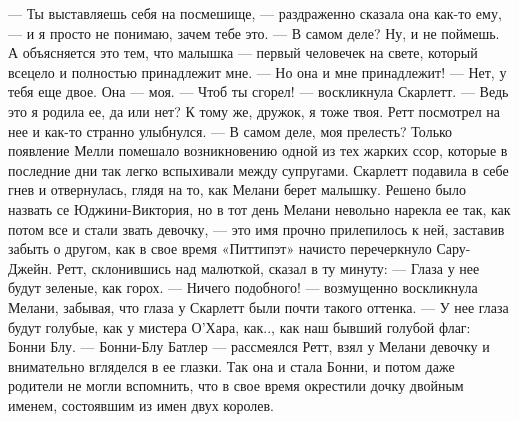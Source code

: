 — Ты выставляешь себя на посмешище, — раздраженно сказала она как-то ему, — и я просто не понимаю, зачем тебе это.
— В самом деле? Ну, и не поймешь. А объясняется это тем, что малышка — первый человечек на свете, который всецело и полностью принадлежит мне.
— Но она и мне принадлежит!
— Нет, у тебя еще двое. Она — моя.
— Чтоб ты сгорел! — воскликнула Скарлетт. — Ведь это я родила ее, да или нет? К тому же, дружок, я тоже твоя. Ретт посмотрел на нее и как-то странно улыбнулся.
— В самом деле, моя прелесть?
Только появление Мелли помешало возникновению одной из тех жарких ссор, которые в последние дни так легко вспыхивали между супругами. Скарлетт подавила в себе гнев и отвернулась, глядя на то, как Мелани берет малышку. Решено было назвать се Юджини-Виктория, но в тот день Мелани невольно нарекла ее так, как потом все и стали звать девочку, — это имя прочно прилепилось к ней, заставив забыть о другом, как в свое время «Питтипэт» начисто перечеркнуло Сару-Джейн.
Ретт, склонившись над малюткой, сказал в ту минуту:
— Глаза у нее будут зеленые, как горох.
— Ничего подобного! — возмущенно воскликнула Мелани, забывая, что глаза у Скарлетт были почти такого оттенка. — У нее глаза будут голубые, как у мистера О’Хара, как.., как наш бывший голубой флаг: Бонни Блу.
— Бонни-Блу Батлер — рассмеялся Ретт, взял у Мелани девочку и внимательно вгляделся в ее глазки.
Так она и стала Бонни, и потом даже родители не могли вспомнить, что в свое время окрестили дочку двойным именем, состоявшим из имен двух королев.

